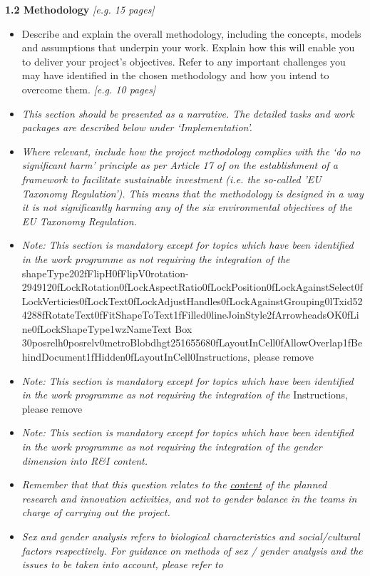 \textbf{1.2 Methodology }\emph{{[}e.g. 15 pages{]}}

\begin{itemize}
\item
  Describe and explain the overall methodology, including the concepts,
  models and assumptions that underpin your work. Explain how this will
  enable you to deliver your project's objectives. Refer to any
  important challenges you may have identified in the chosen methodology
  and how you intend to overcome them. \emph{{[}e.g. 10 pages{]}}
\end{itemize}

\begin{itemize}
\item
  \emph{This section should be presented as a narrative. The detailed
  tasks and work packages are described below under `Implementation'. }
\item
  \emph{Where relevant, include how the project methodology complies
  with the `do no significant harm' principle as per Article 17 of on
  the establishment of a framework to facilitate sustainable investment
  (i.e. the so-called 'EU Taxonomy Regulation'). This means that the
  methodology is designed in a way it is not significantly harming any
  of the six environmental objectives of the EU Taxonomy Regulation.}
\end{itemize}

\begin{itemize}
\item
  \emph{Note: This section is mandatory except for topics which have
  been identified in the work programme as not requiring the integration
  of the
  }shapeType202fFlipH0fFlipV0rotation-2949120fLockRotation0fLockAspectRatio0fLockPosition0fLockAgainstSelect0fLockVerticies0fLockText0fLockAdjustHandles0fLockAgainstGrouping0lTxid524288fRotateText0fFitShapeToText1fFilled0lineJoinStyle2fArrowheadsOK0fLine0fLockShapeType1wzNameText
  Box
  30posrelh0posrelv0metroBlobdhgt251655680fLayoutInCell0fAllowOverlap1fBehindDocument1fHidden0fLayoutInCell0Instructions,
  please remove
\item
  \emph{Note: This section is mandatory except for topics which have
  been identified in the work programme as not requiring the integration
  of the }Instructions, please remove
\item
  \emph{Note: This section is mandatory except for topics which have
  been identified in the work programme as not requiring the integration
  of the gender dimension into R\&I content.}
\item
  \emph{Remember that that this question relates to the \uline{content}
  of the planned research and innovation activities, and not to gender
  balance in the teams in charge of carrying out the project.}
\item
  \emph{Sex and gender analysis refers to biological characteristics and
  social/cultural factors respectively. For guidance on methods of sex /
  gender analysis and the issues to be taken into account, please refer
  to }
\end{itemize}

